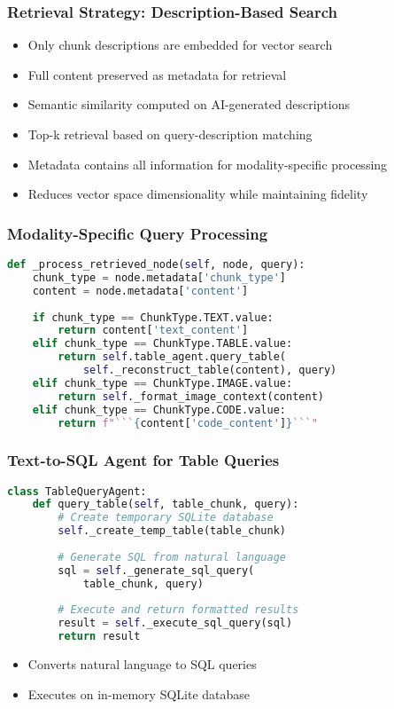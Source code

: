 \begin{frame}[fragile]\frametitle{Retrieval Strategy: Description-Based Search}
\begin{itemize}
\item Only chunk descriptions are embedded for vector search
\item Full content preserved as metadata for retrieval
\item Semantic similarity computed on AI-generated descriptions
\item Top-k retrieval based on query-description matching
\item Metadata contains all information for modality-specific processing
\item Reduces vector space dimensionality while maintaining fidelity
\end{itemize}
\end{frame}

\begin{frame}[fragile]\frametitle{Modality-Specific Query Processing}
\begin{lstlisting}[language=Python]
def _process_retrieved_node(self, node, query):
    chunk_type = node.metadata['chunk_type']
    content = node.metadata['content']
    
    if chunk_type == ChunkType.TEXT.value:
        return content['text_content']
    elif chunk_type == ChunkType.TABLE.value:
        return self.table_agent.query_table(
            self._reconstruct_table(content), query)
    elif chunk_type == ChunkType.IMAGE.value:
        return self._format_image_context(content)
    elif chunk_type == ChunkType.CODE.value:
        return f"```{content['code_content']}```"
\end{lstlisting}
\end{frame}

\begin{frame}[fragile]\frametitle{Text-to-SQL Agent for Table Queries}
\begin{lstlisting}[language=Python]
class TableQueryAgent:
    def query_table(self, table_chunk, query):
        # Create temporary SQLite database
        self._create_temp_table(table_chunk)
        
        # Generate SQL from natural language
        sql = self._generate_sql_query(
            table_chunk, query)
        
        # Execute and return formatted results
        result = self._execute_sql_query(sql)
        return result
\end{lstlisting}
\begin{itemize}
\item Converts natural language to SQL queries
\item Executes on in-memory SQLite database
\end{itemize}
\end{frame}

